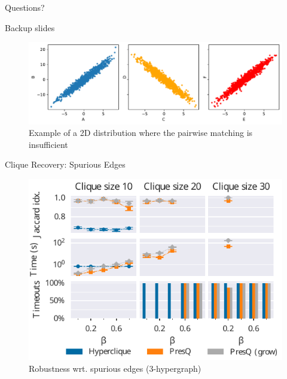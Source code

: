 \documentclass[10pt]{beamer}
\begin{document}
{
\begin{frame}[standout]
  \huge Questions?
\end{frame}
}

\appendix

{
\begin{frame}[standout]
  Backup slides
\end{frame}
}

\begin{frame}{}
\begin{figure}
    \centering
    \includegraphics[width=\textwidth]{no2ind.pdf}
    \caption{Example of a 2D distribution where the pairwise matching is insufficient}
\end{figure}
\end{frame}

\begin{frame}{Clique Recovery: Spurious Edges}
    \begin{figure}
        \centering
        \includegraphics{3hyper_beta}
        \caption{Robustness wrt. spurious edges (3-hypergraph)}
    \end{figure}
\end{frame}
\end{document}
